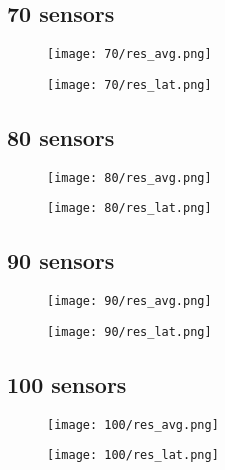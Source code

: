 \subsection{70 sensors}
\begin{figure}[H]
\texttt{[image: 70/res\_avg.png]}
\end{figure}
\begin{figure}[H]
\texttt{[image: 70/res\_lat.png]}
\end{figure}

\subsection{80 sensors}
\begin{figure}[H]
\texttt{[image: 80/res\_avg.png]}
\end{figure}
\begin{figure}[H]
\texttt{[image: 80/res\_lat.png]}
\end{figure}

\subsection{90 sensors}
\begin{figure}[H]
\texttt{[image: 90/res\_avg.png]}
\end{figure}
\begin{figure}[H]
\texttt{[image: 90/res\_lat.png]}
\end{figure}

\subsection{100 sensors}
\begin{figure}[H]
\texttt{[image: 100/res\_avg.png]}
\end{figure}
\begin{figure}[H]
\texttt{[image: 100/res\_lat.png]}
\end{figure}
